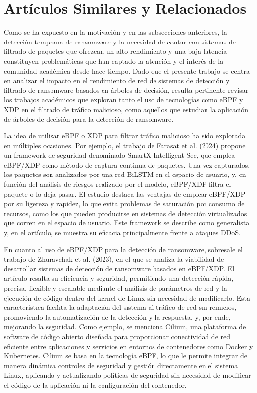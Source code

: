 \section{Artículos Similares y Relacionados}
Como se ha expuesto en la motivación y en las subsecciones anteriores, la detección temprana de ransomware y la necesidad de contar con sistemas de filtrado de paquetes que ofrezcan un alto rendimiento y una baja latencia constituyen problemáticas que han captado la atención y el interés de la comunidad académica desde hace tiempo. Dado que el presente trabajo se centra en analizar el impacto en el rendimiento de red de sistemas de detección y filtrado de ransomware basados en árboles de decisión, resulta pertinente revisar los trabajos académicos que exploran tanto el uso de tecnologías como eBPF y XDP en el filtrado de tráfico malicioso, como aquellos que estudian la aplicación de árboles de decisión para la detección de ransomware.

La idea de utilizar eBPF o XDP para filtrar tráfico malicioso ha sido explorada en múltiples ocasiones. Por ejemplo, el trabajo de Farasat et al. (2024)\cite{Farasat2024SmartX} propone un framework de seguridad denominado SmartX Intelligent Sec, que emplea eBPF/XDP como método de captura continua de paquetes. Una vez capturados, los paquetes son analizados por una red BiLSTM en el espacio de usuario, y, en función del análisis de riesgos realizado por el modelo, eBPF/XDP filtra el paquete o lo deja pasar. El estudio destaca las ventajas de emplear eBPF/XDP por su ligereza y rapidez, lo que evita problemas de saturación por consumo de recursos, como los que pueden producirse en sistemas de detección virtualizados que corren en el espacio de usuario. Este framework se describe como generalista y, en el artículo, se muestra su eficacia principalmente frente a ataques DDoS.

En cuanto al uso de eBPF/XDP para la detección de ransomware, sobresale el trabajo de Zhuravchak et al. (2023)\cite{Zhuravchak2023Monitoring}, en el que se analiza la viabilidad de desarrollar sistemas de detección de ransomware basados en eBPF/XDP. El artículo resalta su eficiencia y seguridad, permitiendo una detección rápida, precisa, flexible y escalable mediante el análisis de parámetros de red y la ejecución de código dentro del kernel de Linux sin necesidad de modificarlo. Esta característica facilita la adaptación del sistema al tráfico de red sin reinicios, promoviendo la automatización de la detección y la respuesta, y, por ende, mejorando la seguridad. Como ejemplo, se menciona Cilium, una plataforma de software de código abierto diseñada para proporcionar conectividad de red eficiente entre aplicaciones y servicios en entornos de contenedores como Docker y Kubernetes. Cilium se basa en la tecnología eBPF, lo que le permite integrar de manera dinámica controles de seguridad y gestión directamente en el sistema Linux, aplicando y actualizando políticas de seguridad sin necesidad de modificar el código de la aplicación ni la configuración del contenedor.

